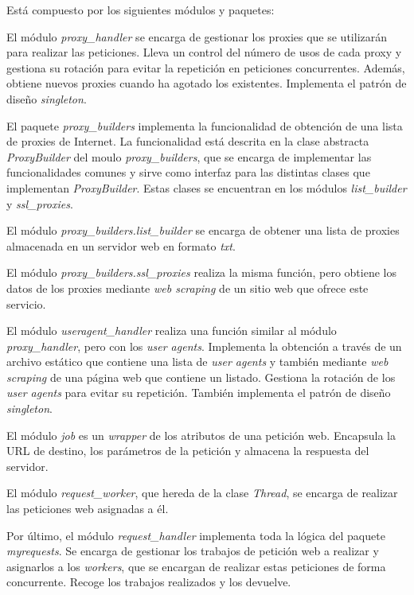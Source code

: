 Está compuesto por los siguientes módulos y paquetes:

El módulo \textit{proxy\_handler} se encarga de gestionar los proxies que se utilizarán para
realizar las peticiones. Lleva un control del número de usos de cada proxy y gestiona su rotación
para evitar la repetición en peticiones concurrentes. Además, obtiene nuevos proxies cuando ha
agotado los existentes. Implementa el patrón de diseño \textit{singleton}.

El paquete \textit{proxy\_builders} implementa la funcionalidad de obtención de una lista de
proxies de Internet. La funcionalidad está descrita en la clase abstracta \textit{ProxyBuilder} del moulo \textit{proxy\_builders},
que se encarga de implementar las funcionalidades comunes y sirve como interfaz para las distintas
clases que implementan \textit{ProxyBuilder}. Estas clases se encuentran en los
módulos \textit{list\_builder} y \textit{ssl\_proxies}.

El módulo \textit{proxy\_builders.list\_builder} se encarga de obtener una lista de proxies almacenada en un
servidor web en formato \textit{txt}.

El módulo \textit{proxy\_builders.ssl\_proxies} realiza la misma función, pero obtiene los datos de los
proxies mediante \textit{web scraping} de un sitio web que ofrece este servicio.

El módulo \textit{useragent\_handler} realiza una función similar al
módulo \textit{proxy\_handler}, pero con los \textit{user agents}. Implementa la obtención a
través de un archivo estático que contiene una lista de \textit{user agents} y también mediante \textit{web scraping} de una página web que contiene un listado. Gestiona la rotación de los \textit{user agents} para evitar su repetición. También implementa el patrón de diseño \textit{singleton}.

El módulo \textit{job} es un \textit{wrapper} de los atributos de una petición web.
Encapsula la URL de destino, los parámetros de la petición y almacena la respuesta del servidor.

El módulo \textit{request\_worker}, que hereda de la clase \textit{Thread}, se encarga de
realizar las peticiones web asignadas a él.

Por último, el módulo \textit{request\_handler} implementa toda la lógica del
paquete \textit{myrequests}. Se encarga de gestionar los trabajos de petición web a realizar y
asignarlos a los \textit{workers}, que se encargan de realizar estas peticiones de forma concurrente.
Recoge los trabajos realizados y los devuelve.

